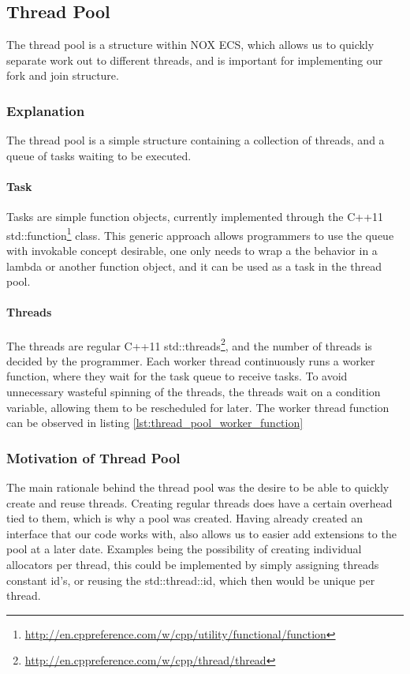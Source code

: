 \subsection{Thread Pool}
The thread pool is a structure within NOX ECS, which allows us to quickly
separate work out to different threads, and is important for implementing our
fork and join structure.

\subsubsection{Explanation}
The thread pool is a simple structure containing a collection of threads, and a queue of
tasks waiting to be executed.

\paragraph{Task}
Tasks are simple function objects, currently implemented through the C++11 std::function\footnote{\url{http://en.cppreference.com/w/cpp/utility/functional/function}} class.
This generic approach allows programmers to use the queue with invokable concept desirable,
one only needs to wrap a the behavior in a lambda or another function object, and it can be used as a
task in the thread pool.

\paragraph{Threads}
The threads are regular C++11 std::threads\footnote{\url{http://en.cppreference.com/w/cpp/thread/thread}},
and the number of threads is decided by the programmer.
Each worker thread continuously runs a worker function, where they wait for the task queue to receive tasks.
To avoid unnecessary wasteful spinning of the threads, the threads wait on a condition variable,
allowing them to be rescheduled for later.
The worker thread function can be observed in listing \ref{lst:thread_pool_worker_function}


\subsubsection{Motivation of Thread Pool}
The main rationale behind the thread pool was the desire to be able to quickly create and reuse threads.
Creating regular threads does have a certain overhead tied to them, which is why a pool was created.
Having already created an interface that our code works with, also allows us to easier add extensions to the pool
at a later date. Examples being the possibility of creating individual allocators per thread,
this could be implemented by simply assigning threads constant id's, or reusing the std::thread::id, which then would be unique per thread.

